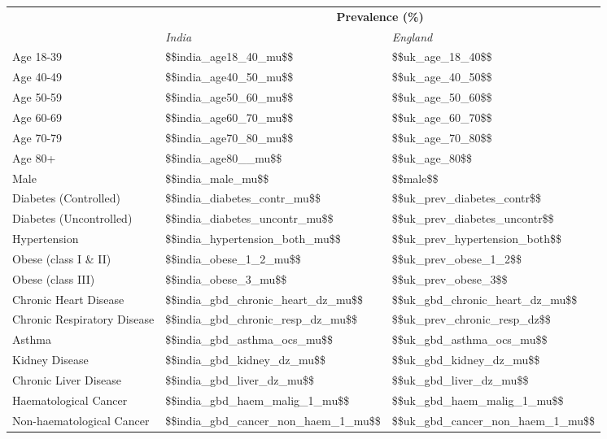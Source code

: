 \begin{tabular}{p{6cm}p{1.1cm}p{1cm}}
& \multicolumn{2}{c}{\textbf{Prevalence (\%)  }} \\[0.5ex] & \emph{India} & \emph{England} \\[2ex]
Age 18-39 & \num{$$india_age18_40_mu$$} & \num{$$uk_age_18_40$$} \\[0.25ex]
Age 40-49 & \num{$$india_age40_50_mu$$} & \num{$$uk_age_40_50$$} \\[0.25ex]
Age 50-59 & \num{$$india_age50_60_mu$$} & \num{$$uk_age_50_60$$}\\[0.25ex]
Age 60-69 & \num{$$india_age60_70_mu$$} & \num{$$uk_age_60_70$$}\\[0.25ex]
Age 70-79 & \num{$$india_age70_80_mu$$} & \num{$$uk_age_70_80$$}\\[0.25ex]
Age 80+ & \num{$$india_age80__mu$$} & \num{$$uk_age_80$$} \\[0.25ex]
Male & \num{$$india_male_mu$$} & \num{$$male$$} \\[0.25ex]
Diabetes (Controlled) & \num{$$india_diabetes_contr_mu$$} & \num{$$uk_prev_diabetes_contr$$} \\[0.25ex]
Diabetes (Uncontrolled) & \num{$$india_diabetes_uncontr_mu$$} & \num{$$uk_prev_diabetes_uncontr$$} \\[0.25ex]
Hypertension & \num{$$india_hypertension_both_mu$$} & \num{$$uk_prev_hypertension_both$$} \\[0.25ex]
Obese (class I \& II) & \num{$$india_obese_1_2_mu$$} & \num{$$uk_prev_obese_1_2$$} \\[0.25ex]
Obese (class III) & \num{$$india_obese_3_mu$$} & \num{$$uk_prev_obese_3$$} \\[0.25ex]
Chronic Heart Disease & \num{$$india_gbd_chronic_heart_dz_mu$$} & \num{$$uk_gbd_chronic_heart_dz_mu$$} \\[0.25ex]
Chronic Respiratory Disease & \num{$$india_gbd_chronic_resp_dz_mu$$} & \num{$$uk_prev_chronic_resp_dz$$} \\[0.25ex]
Asthma & \num{$$india_gbd_asthma_ocs_mu$$} & \num{$$uk_gbd_asthma_ocs_mu$$} \\[0.25ex]
Kidney Disease & \num{$$india_gbd_kidney_dz_mu$$} & \num{$$uk_gbd_kidney_dz_mu$$} \\[0.25ex]
Chronic Liver Disease & \num{$$india_gbd_liver_dz_mu$$} & \num{$$uk_gbd_liver_dz_mu$$} \\[0.25ex]
Haematological Cancer & \num{$$india_gbd_haem_malig_1_mu$$} & \num{$$uk_gbd_haem_malig_1_mu$$}\\[0.25ex]
Non-haematological Cancer & \num{$$india_gbd_cancer_non_haem_1_mu$$} & \num{$$uk_gbd_cancer_non_haem_1_mu$$} \\[0.25ex]

\end{tabular}
